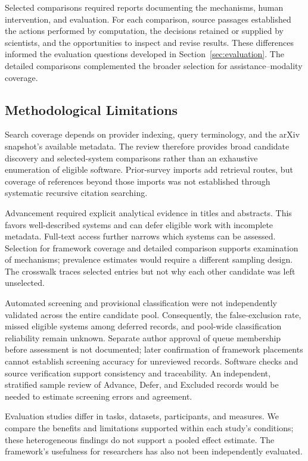 Selected comparisons required reports documenting the mechanisms, human intervention, and evaluation. For each comparison, source passages established the actions performed by computation, the decisions retained or supplied by scientists, and the opportunities to inspect and revise results. These differences informed the evaluation questions developed in Section~\ref{sec:evaluation}. The detailed comparisons complemented the broader selection for assistance--modality coverage.

\subsection{Methodological Limitations}
\label{sec:methodology-limitations}
Search coverage depends on provider indexing, query terminology, and the arXiv snapshot's available metadata. The review therefore provides broad candidate discovery and selected-system comparisons rather than an exhaustive enumeration of eligible software. Prior-survey imports add retrieval routes, but coverage of references beyond those imports was not established through systematic recursive citation searching.

Advancement required explicit analytical evidence in titles and abstracts. This favors well-described systems and can defer eligible work with incomplete metadata. Full-text access further narrows which systems can be assessed. Selection for framework coverage and detailed comparison supports examination of mechanisms; prevalence estimates would require a different sampling design. The crosswalk traces selected entries but not why each other candidate was left unselected.

Automated screening and provisional classification were not independently validated across the entire candidate pool. Consequently, the false-exclusion rate, missed eligible systems among deferred records, and pool-wide classification reliability remain unknown. Separate author approval of queue membership before assessment is not documented; later confirmation of framework placements cannot establish screening accuracy for unreviewed records. Software checks and source verification support consistency and traceability. An independent, stratified sample review of Advance, Defer, and Excluded records would be needed to estimate screening errors and agreement.

Evaluation studies differ in tasks, datasets, participants, and measures. We compare the benefits and limitations supported within each study's conditions; these heterogeneous findings do not support a pooled effect estimate. The framework's usefulness for researchers has also not been independently evaluated.

